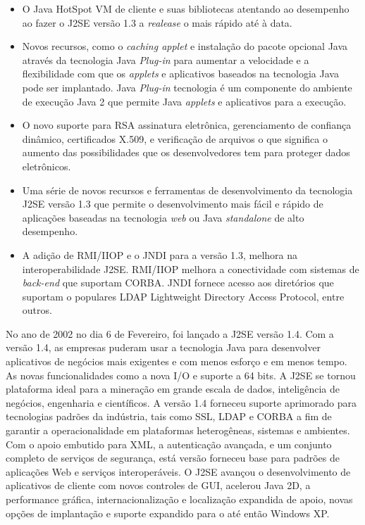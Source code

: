 \begin{itemize}
  \item O Java HotSpot VM de cliente e suas bibliotecas atentando ao desempenho ao fazer o J2SE versão 1.3 a {\it realease} o mais rápido até à data.
  \item Novos recursos, como o {\it caching applet} e instalação do pacote opcional Java através da tecnologia Java {\it  Plug-in} para aumentar a velocidade e a flexibilidade com que os {\it applets} e aplicativos baseados na tecnologia Java pode ser implantado. Java {\it  Plug-in} tecnologia é um componente do ambiente de execução Java 2 que permite Java {\it applets} e aplicativos para a execução.
  \item O novo suporte para \acs{RSA} assinatura eletrônica, gerenciamento de confiança dinâmico, certificados X.509, e verificação de arquivos o que significa o aumento das possibilidades que os desenvolvedores tem para proteger dados eletrônicos.
  \item Uma série de novos recursos e ferramentas de desenvolvimento da tecnologia J2SE versão 1.3 que permite o desenvolvimento mais fácil e rápido de aplicações baseadas na tecnologia {\it web} ou Java {\it  standalone} de alto desempenho.
  \item A adição de RMI/IIOP e o JNDI para a versão 1.3, melhora na interoperabilidade J2SE. RMI/IIOP melhora a conectividade com sistemas de {\it  back-end} que suportam CORBA. JNDI fornece acesso aos diretórios que suportam o populares LDAP Lightweight Directory Access Protocol, entre outros.\\
\end{itemize}

No ano de 2002 no dia 6 de Fevereiro, foi lançado a J2SE versão 1.4. Com a versão 1.4, as empresas puderam usar a tecnologia Java para desenvolver aplicativos de negócios mais exigentes e com menos esforço e em menos tempo. As novas funcionalidades como a nova I/O e suporte a 64 bits. A J2SE se tornou plataforma ideal para a mineração em grande escala de dados, inteligência de negócios, engenharia e científicos. A versão 1.4 forneceu suporte aprimorado para tecnologias padrões da indústria, tais como SSL, LDAP e CORBA a fim de garantir a operacionalidade em plataformas heterogêneas, sistemas e ambientes. Com o apoio embutido para XML, a autenticação avançada, e um conjunto completo de serviços de segurança, está versão forneceu base para padrões de aplicações Web e serviços interoperáveis. O J2SE avançou o desenvolvimento de aplicativos de cliente com novos controles de GUI, acelerou Java 2D, a performance gráfica, internacionalização e localização expandida de apoio, novas opções de implantação e suporte expandido para o até então Windows XP.\\

